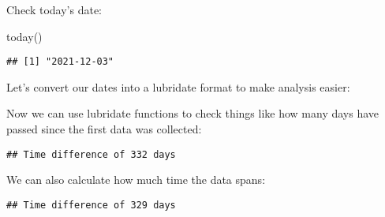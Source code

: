 \documentclass[
]{article}
\newenvironment{Shaded}{\begin{snugshade}}{\end{snugshade}}
\newcommand{\CommentTok}[1]{\textcolor[rgb]{0.56,0.35,0.01}{\textit{#1}}}
\newcommand{\DecValTok}[1]{\textcolor[rgb]{0.00,0.00,0.81}{#1}}
\newcommand{\FunctionTok}[1]{\textcolor[rgb]{0.00,0.00,0.00}{#1}}
\newcommand{\NormalTok}[1]{#1}
\newcommand{\OtherTok}[1]{\textcolor[rgb]{0.56,0.35,0.01}{#1}}
\newcommand{\SpecialCharTok}[1]{\textcolor[rgb]{0.00,0.00,0.00}{#1}}
\begin{document}
Check today's date:

\begin{Shaded}
\begin{Highlighting}[]
\FunctionTok{today}\NormalTok{()}
\end{Highlighting}
\end{Shaded}

\begin{verbatim}
## [1] "2021-12-03"
\end{verbatim}

Let's convert our dates into a lubridate format to make analysis easier:

\begin{Shaded}
\end{Shaded}

Now we can use lubridate functions to check things like how many days
have passed since the first data was collected:

\begin{Shaded}
\end{Shaded}

\begin{verbatim}
## Time difference of 332 days
\end{verbatim}

We can also calculate how much time the data spans:

\begin{Shaded}
\end{Shaded}

\begin{verbatim}
## Time difference of 329 days
\end{verbatim}
\end{document}
